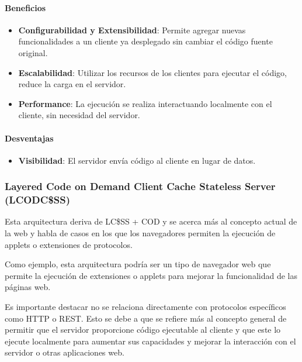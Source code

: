\documentclass{article}
\begin{document}
		\paragraph{Beneficios}
			\begin{itemize}	
				\item {\textbf{Configurabilidad y Extensibilidad}}: Permite agregar nuevas funcionalidades a un cliente ya desplegado sin cambiar el código fuente original.
								
				\item {\textbf{Escalabilidad}}: Utilizar los recursos de los clientes para ejecutar el código, reduce la carga en el servidor.
				
				\item {\textbf{Performance}}: La ejecución se realiza interactuando localmente con el
				cliente, sin necesidad del servidor.
				
			\end{itemize}
		
		\paragraph{Desventajas}
			\begin{itemize}	
				\item {\textbf{Visibilidad}}: El servidor envía código al cliente en lugar de datos.			
			\end{itemize}
		
		
		
		\subsubsection{Layered Code on Demand Client Cache Stateless Server (LCODC\$SS)}
		Esta arquitectura deriva de LC\$SS + COD y se acerca más al concepto actual de la web y habla de casos en los que los navegadores permiten la ejecución de applets o extensiones de protocolos.
		
		Como ejemplo, esta arquitectura podría ser un tipo de navegador web que permite la ejecución de extensiones o applets para mejorar la funcionalidad de las páginas web.
		
		Es importante destacar no se relaciona directamente con protocolos específicos como HTTP o REST. Esto se debe a que se refiere más al concepto general de permitir que el servidor proporcione código ejecutable al cliente y que este lo ejecute localmente para aumentar sus capacidades y mejorar la interacción con el servidor o otras aplicaciones web.
		
\end{document}
